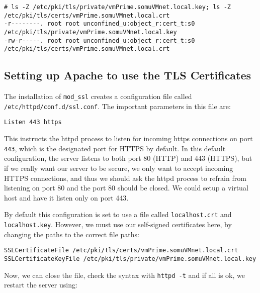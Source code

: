 \vspace{-15pt}
\begin{verbatim}
# ls -Z /etc/pki/tls/private/vmPrime.somuVMnet.local.key; ls -Z /etc/pki/tls/certs/vmPrime.somuVMnet.local.crt 
-r--------. root root unconfined_u:object_r:cert_t:s0  /etc/pki/tls/private/vmPrime.somuVMnet.local.key
-rw-r-----. root root unconfined_u:object_r:cert_t:s0  /etc/pki/tls/certs/vmPrime.somuVMnet.local.crt
\end{verbatim}
\vspace{-10pt}	

\subsection{Setting up Apache to use the TLS Certificates}
The installation of \verb|mod_ssl| creates a configuration file called \verb|/etc/httpd/conf.d/ssl.conf|. The important parameters in this file are:

\vspace{-15pt}
\begin{verbatim}
Listen 443 https
\end{verbatim}
\vspace{-10pt}	

\noindent
This instructs the httpd process to listen for incoming https connections on port \verb|443|, which is the designated port for HTTPS by default. In this default configuration, the server listens to both port 80 (HTTP) and 443 (HTTPS), but if we really want our server to be secure, we only want to accept incoming HTTPS connections, and thus we should ask the httpd process to refrain from listening on port 80 and the port 80 should be closed. We could setup a virtual host and have it listen only on port 443. 

By default this configuration is set to use a file called \verb|localhost.crt| and \verb|localhost.key|. However, we must use our self-signed certificates here, by changing the paths to the correct file paths:

\vspace{-15pt}
\begin{verbatim}
SSLCertificateFile /etc/pki/tls/certs/vmPrime.somuVMnet.local.crt
SSLCertificateKeyFile /etc/pki/tls/private/vmPrime.somuVMnet.local.key
\end{verbatim}
\vspace{-10pt}	

\noindent
Now, we can close the file, check the syntax with \verb|httpd -t| and if all is ok, we restart the server using:

